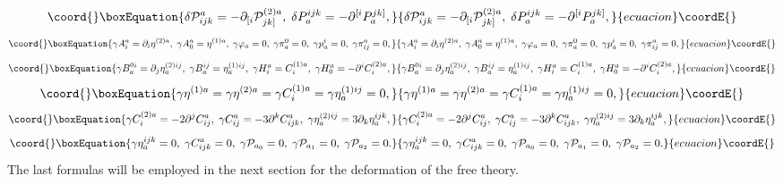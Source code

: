 \documentclass[a4paper,12pt]{article}
\begin{document}
\begin{equation}\coord{}\boxEquation{
\delta \mathcal{P}_{ijk}^{a}=-\partial _{[i}\mathcal{P}_{jk]}^{(2)a},\;
\delta P_{a}^{ijk}=-\partial ^{[i}P_{a}^{jk]},  \label{xx32}
}{
\delta \mathcal{P}_{ijk}^{a}=-\partial _{[i}\mathcal{P}_{jk]}^{(2)a},\;
\delta P_{a}^{ijk}=-\partial ^{[i}P_{a}^{jk]},  }{ecuacion}\coordE{}\end{equation}
\begin{equation}\coord{}\boxEquation{
\gamma A_{i}^{a}=\partial _{i}\eta ^{(2)a},\;\gamma A_{0}^{a}=\eta
^{(1)a},\;\gamma \varphi _{a}=0,\;\gamma \pi _{a}^{0}=0,\;\gamma
p_{a}^{i}=0,\;\gamma \pi _{ij}^{a}=0,  \label{xx34}
}{
\gamma A_{i}^{a}=\partial _{i}\eta ^{(2)a},\;\gamma A_{0}^{a}=\eta
^{(1)a},\;\gamma \varphi _{a}=0,\;\gamma \pi _{a}^{0}=0,\;\gamma
p_{a}^{i}=0,\;\gamma \pi _{ij}^{a}=0,  }{ecuacion}\coordE{}\end{equation}
\begin{equation}\coord{}\boxEquation{
\gamma B_{a}^{0i}=\partial _{j}\eta _{a}^{(2)ij},\;\gamma B_{a}^{ij}=\eta
_{a}^{(1)ij},\;\gamma H_{i}^{a}=C_{i}^{(1)a},\;\gamma H_{0}^{a}=-\partial
^{i}C_{i}^{(2)a},  \label{xx35}
}{
\gamma B_{a}^{0i}=\partial _{j}\eta _{a}^{(2)ij},\;\gamma B_{a}^{ij}=\eta
_{a}^{(1)ij},\;\gamma H_{i}^{a}=C_{i}^{(1)a},\;\gamma H_{0}^{a}=-\partial
^{i}C_{i}^{(2)a},  }{ecuacion}\coordE{}\end{equation}
\begin{equation}\coord{}\boxEquation{
\gamma \eta ^{(1)a}=\gamma \eta ^{(2)a}=\gamma C_{i}^{(1)a}=\gamma \eta
_{a}^{(1)ij}=0,  \label{xx36}
}{
\gamma \eta ^{(1)a}=\gamma \eta ^{(2)a}=\gamma C_{i}^{(1)a}=\gamma \eta
_{a}^{(1)ij}=0,  }{ecuacion}\coordE{}\end{equation}
\begin{equation}\coord{}\boxEquation{
\gamma C_{i}^{(2)a}=-2\partial ^{j}C_{ij}^{a},\;\gamma C_{ij}^{a}=-3\partial
^{k}C_{ijk}^{a},\;\gamma \eta _{a}^{(2)ij}=3\partial _{k}\eta _{a}^{ijk},
\label{xx37}
}{
\gamma C_{i}^{(2)a}=-2\partial ^{j}C_{ij}^{a},\;\gamma C_{ij}^{a}=-3\partial
^{k}C_{ijk}^{a},\;\gamma \eta _{a}^{(2)ij}=3\partial _{k}\eta _{a}^{ijk},
}{ecuacion}\coordE{}\end{equation}
\begin{equation}\coord{}\boxEquation{
\gamma \eta _{a}^{ijk}=0,\;\gamma C_{ijk}^{a}=0,\;\gamma \mathcal{P}
_{a_{0}}=0,\;\gamma \mathcal{P}_{a_{1}}=0,\;\gamma \mathcal{P}_{a_{2}}=0.
\label{xx38}
}{
\gamma \eta _{a}^{ijk}=0,\;\gamma C_{ijk}^{a}=0,\;\gamma \mathcal{P}
_{a_{0}}=0,\;\gamma \mathcal{P}_{a_{1}}=0,\;\gamma \mathcal{P}_{a_{2}}=0.
}{ecuacion}\coordE{}\end{equation}
The last formulas will be employed in the next section for the deformation
of the free theory.
\end{document}
